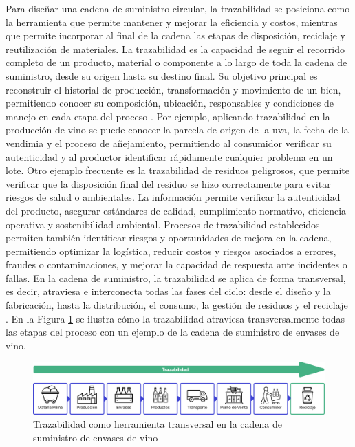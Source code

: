 Para diseñar una cadena de suministro circular, la \gls{trazabilidad} se posiciona como la herramienta que permite mantener y mejorar la eficiencia y costos, mientras que permite incorporar al final de la cadena las etapas de disposición, reciclaje y reutilización de materiales. La trazabilidad es la capacidad de seguir el recorrido completo de un producto, material o componente a lo largo de toda la cadena de suministro, desde su origen hasta su destino final. Su objetivo principal es reconstruir el historial de producción, transformación y movimiento de un bien, permitiendo conocer su composición, ubicación, responsables y condiciones de manejo en cada etapa del proceso \cite{bartolomeo2020introduccion}. Por ejemplo, aplicando trazabilidad en la producción de vino se puede conocer la parcela de origen de la uva, la fecha de la vendimia y el proceso de añejamiento, permitiendo al consumidor verificar su autenticidad y al productor identificar rápidamente cualquier problema en un lote. Otro ejemplo frecuente es la trazabilidad de residuos peligrosos, que permite verificar que la disposición final del residuo se hizo correctamente para evitar riesgos de salud o ambientales. La información permite verificar la autenticidad del producto, asegurar estándares de calidad, cumplimiento normativo, eficiencia operativa y \gls{sostenibilidad} ambiental. Procesos de trazabilidad establecidos permiten también identificar riesgos y oportunidades de mejora en la cadena, permitiendo optimizar la logística, reducir costos y riesgos asociados a errores, fraudes o contaminaciones, y mejorar la capacidad de respuesta ante incidentes o fallas. En la cadena de suministro, la trazabilidad se aplica de forma transversal, es decir, atraviesa e interconecta todas las fases del ciclo: desde el diseño y la fabricación, hasta la distribución, el consumo, la gestión de residuos y el reciclaje \cite{cepal2021economia}. En la Figura \ref{fig:supply-chain-traceability} se ilustra cómo la trazabilidad atraviesa transversalmente todas las etapas del proceso con un ejemplo de la cadena de suministro de envases de vino.

\begin{figure}[!b]
    \centering
    \includegraphics[width=\textwidth]{Figures/supply-chain-traceability.png}
    \caption{Trazabilidad como herramienta transversal en la cadena de suministro de envases de vino}
    \label{fig:supply-chain-traceability}
\end{figure}

